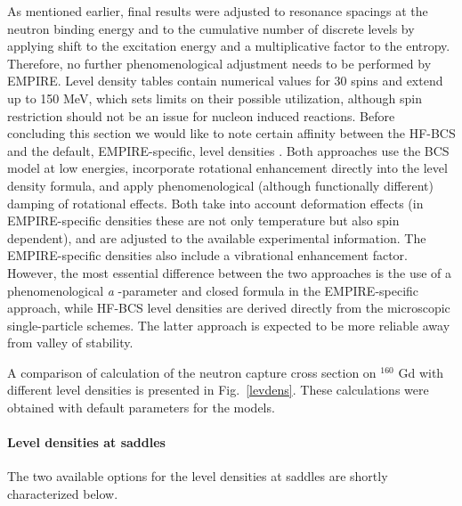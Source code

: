 As mentioned earlier, final results were adjusted to resonance spacings at
the neutron binding energy and to the cumulative number of discrete levels
by applying shift to the excitation energy and a multiplicative factor to
the entropy. Therefore, no further phenomenological adjustment needs to be
performed by EMPIRE. Level density tables contain numerical values for 30
spins and extend up to 150 MeV, which sets limits on their possible
utilization, although spin restriction should not be an issue for nucleon
induced reactions. Before concluding this section we would like to note
certain affinity between the HF-BCS%
 and the default, EMPIRE-specific, level densities%
. Both approaches use the BCS%
 model at low energies, incorporate rotational enhancement
directly into the level density formula, and apply phenomenological
(although functionally different) damping of rotational effects. Both take
into account deformation effects (in EMPIRE-specific densities these are not
only temperature but also spin dependent), and are adjusted to the available
experimental information. The EMPIRE-specific densities also include a
vibrational enhancement factor. However, the most essential difference
between the two approaches is the use of a phenomenological \emph{a}%
-parameter and closed formula in the EMPIRE-specific approach, while HF-BCS%
 level densities%
 are derived directly from the microscopic
single-particle schemes. The latter approach is expected to be more reliable
away from valley of stability.

A comparison of calculation of the neutron capture cross section on $^{160}$%
Gd with different level densities is presented in Fig.~\ref{levdens}. These
calculations were obtained with default parameters for the models.

\medskip

\paragraph{Level densities at saddles\label{ldsaddle}}

The two available options for the level densities at saddles are shortly
characterized below.

